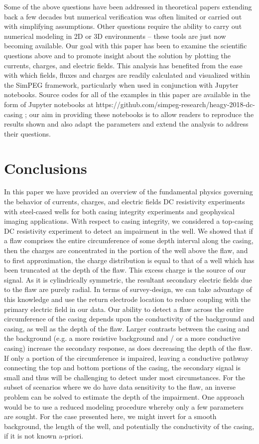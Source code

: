 \documentclass[extra,mreferee]{gji}
\begin{document}
Some of the above questions have been addressed in theoretical papers extending back a few decades but numerical verification was often limited or carried out with simplifying assumptions. Other questions require the ability to carry out numerical modeling in 2D or 3D environments -- these tools are just now becoming available. Our goal with this paper has been to examine the scientific questions above and to promote insight about the solution by plotting the currents, charges, and electric fields. This analysis has benefited from the ease with which fields, fluxes and charges are readily calculated and visualized within the SimPEG framework, particularly when used in conjunction with Jupyter notebooks. Source codes for all of the examples in this paper are available in the form of Jupyter notebooks at https://github.com/simpeg-research/heagy-2018-dc-casing \citep{Heagy2018b}; our aim in providing these notebooks is to allow readers to reproduce the results shown and also adapt the parameters and extend the analysis to address their questions.

\section{Conclusions}
In this paper we have provided an overview of the fundamental physics governing the behavior of currents, charges, and electric fields DC resistivity experiments with steel-cased wells for both casing integrity experiments and geophysical imaging applications. With respect to casing integrity, we considered a top-casing DC resistivity experiment to detect an impairment in the well. We showed that if a flaw comprises the entire circumference of some depth interval along the casing, then the charges are concentrated in the portion of the well above the flaw, and to first approximation, the charge distribution is equal to that of a well which has been truncated at the depth of the flaw. This excess charge is the source of our signal. As it is cylindrically symmetric, the resultant secondary electric fields due to the flaw are purely radial. In terms of survey-design, we can take advantage of this knowledge and use the return electrode location to reduce coupling with the primary electric field in our data. Our ability to detect a flaw across the entire circumference of the casing depends upon the conductivity of the background and casing, as well as the depth of the flaw. Larger contrasts between the casing and the background (e.g. a more resistive background and / or a more conductive casing) increase the secondary response, as does decreasing the depth of the flaw. If only a portion of the circumference is impaired, leaving a conductive pathway connecting the top and bottom portions of the casing, the secondary signal is small and thus will be challenging to detect under most circumstances. For the subset of scenarios where we do have data sensitivity to the flaw, an inverse problem can be solved to  estimate the depth of the impairment. One approach would be to use a reduced modeling procedure whereby only a few parameters are sought. For the case presented here, we might invert for a smooth background, the length of the well, and potentially the conductivity of the casing, if it is not known a-priori.
\end{document}
